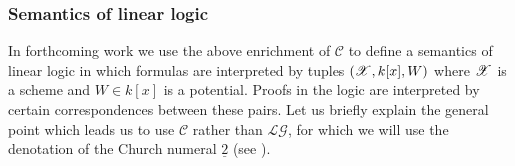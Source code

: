 \documentclass[english,letter paper,12pt,leqno]{article}
\theoremstyle{example}
\numberwithin{equation}{section}
\def\LG{\mathcal{LG}}
\def\L{\mathcal{C}}
\begin{document}



\subsubsection{Semantics of linear logic}

In forthcoming work we use the above enrichment of $\L$ to define a semantics of linear logic \cite{girard_llogic} in which formulas are interpreted by tuples $(\mathscr{X}, k[x], W)$ where $\mathscr{X}$ is a scheme and $W \in k[x]$ is a potential. Proofs in the logic are interpreted by certain correspondences between these pairs. Let us briefly explain the general point which leads us to use $\L$ rather than $\LG$, for which we will use the denotation of the Church numeral $\underline{2}$ (see \cite{murfet_ll}).
\end{document}
